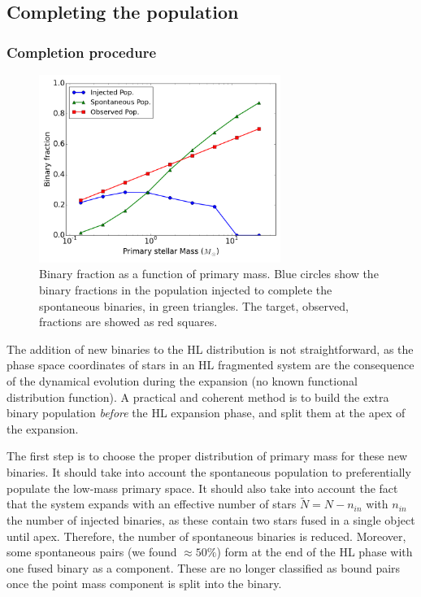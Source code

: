 \subsection{Completing the population}
\label{Sec:Completing}

\subsubsection*{Completion procedure}



\begin{figure}
\begin{center}
\includegraphics[width=0.7\textwidth]{Figures/5_injected_fraction}
\caption[Injected binary population to complete the spontaneous distribution]{Binary fraction as a function of primary mass. Blue circles show the binary fractions in the population injected to complete the spontaneous binaries, in green triangles. The target, observed, fractions are showed as red squares. }
\label{Fig:5_injected}
\end{center}
\end{figure}


The addition of new binaries to the HL distribution is not straightforward, as the phase space coordinates of stars in an HL fragmented system are the consequence of the dynamical evolution during the expansion (no known functional distribution function). A practical and coherent method is to build the extra binary population \textit{before} the HL expansion phase, and split them at the apex of the expansion.

The first step is to choose the proper distribution of primary mass for these new binaries. It should take into account the spontaneous population to preferentially populate the low-mass primary space. It should also take into account the fact that the system expands with an effective number of stars $\tilde{N} = N - n_{in}$ with $n_{in}$ the number of injected binaries, as these contain two stars fused in a single object until apex. Therefore, the number of spontaneous binaries is reduced. Moreover, some spontaneous pairs (we found $\approx 50\%$) form at the end of the HL phase with one fused binary as a component. These are no longer classified as bound pairs once the point mass component is split into the binary. 






